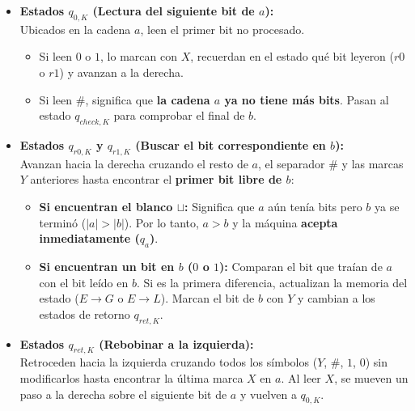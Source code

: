 \begin{itemize}[leftmargin=*]
    \item \textbf{Estados $q_{0,K}$ (Lectura del siguiente bit de $a$):}\\
    Ubicados en la cadena $a$, leen el primer bit no procesado.
    \begin{itemize}[leftmargin=*]
        \item Si leen $0$ o $1$, lo marcan con $X$, recuerdan en el estado qué bit leyeron ($r0$ o $r1$) y avanzan a la derecha.
        \item Si leen $\#$, significa que \textbf{la cadena $a$ ya no tiene más bits}. Pasan al estado $q_{check, K}$ para comprobar el final de $b$.
    \end{itemize}

    \item \textbf{Estados $q_{r0,K}$ y $q_{r1,K}$ (Buscar el bit correspondiente en $b$):}\\
    Avanzan hacia la derecha cruzando el resto de $a$, el separador $\#$ y las marcas $Y$ anteriores hasta encontrar el \textbf{primer bit libre de $b$}:
    \begin{itemize}[leftmargin=*]
        \item \textbf{Si encuentran el blanco $\sqcup$:} Significa que $a$ aún tenía bits pero $b$ ya se terminó ($|a| > |b|$). Por lo tanto, $a > b$ y la máquina \textbf{acepta inmediatamente ($q_a$)}.
        \item \textbf{Si encuentran un bit en $b$ ($0$ o $1$):} Comparan el bit que traían de $a$ con el bit leído en $b$. Si es la primera diferencia, actualizan la memoria del estado ($E \to G$ o $E \to L$). Marcan el bit de $b$ con $Y$ y cambian a los estados de retorno $q_{ret, K}$.
    \end{itemize}

    \item \textbf{Estados $q_{ret,K}$ (Rebobinar a la izquierda):}\\
    Retroceden hacia la izquierda cruzando todos los símbolos ($Y$, $\#$, $1$, $0$) sin modificarlos hasta encontrar la última marca $X$ en $a$. Al leer $X$, se mueven un paso a la derecha sobre el siguiente bit de $a$ y vuelven a $q_{0, K}$.


\end{itemize}
